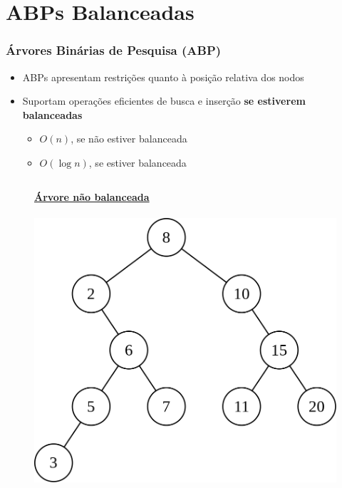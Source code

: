 \documentclass[aspectratio=169]{beamer}
\begin{document}
\section{ABPs Balanceadas}

\begin{frame}\frametitle{Árvores Binárias de Pesquisa (ABP)}
\begin{itemize}
	\item ABPs apresentam restrições quanto à posição relativa dos nodos
	\item Suportam operações eficientes de busca e inserção \textbf{se estiverem balanceadas}
	\begin{itemize}
		\item $O(n)$, se não estiver balanceada
		\item $O(\log{n})$, se estiver balanceada
	\end{itemize}
\end{itemize}
\vspace{-3mm}
\begin{columns}[T]
\begin{column}{0.45\linewidth}
\begin{figure}[h]
	\centering
	\textbf{\underline{Árvore não balanceada}}\\~\\
	\includegraphics[height=0.4\paperheight]{imagens/abp03.png}
\end{figure}

\end{column}
\end{columns}
\end{frame}
\end{document}
